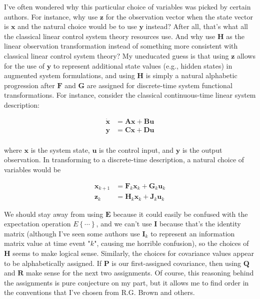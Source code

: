 I’ve often wondered why this particular choice of variables was picked by certain authors.
For instance, why use $\mathbf{z}$ for the observation vector when the state vector is
$\mathbf{x}$ and the natural choice would be to use $\mathbf{y}$ instead? After all,
that’s what all the classical linear control system theory resources use. And why use
$\mathbf{H}$ as the linear observation transformation instead of something more consistent
with classical linear control system theory? My uneducated guess is that using $\mathbf{z}$
allows for the use of $\mathbf{y}$ to represent additional state values (e.g., hidden
states) in augmented system formulations, and using $\mathbf{H}$ is simply a natural
alphabetic progression after $\mathbf{F}$ and $\mathbf{G}$ are assigned for discrete-time
system functional transformations. For instance, consider the classical continuous-time
linear system description:

\begin{equation*}
    \begin{aligned}
        \mathbf{\dot{x}} &= \mathbf{A} \mathbf{x} + \mathbf{B} \mathbf{u} \\
        \mathbf{y} &= \mathbf{C} \mathbf{x} + \mathbf{D} \mathbf{u} \\
    \end{aligned}
\end{equation*}

where $\mathbf{x}$ is the system state, $\mathbf{u}$ is the control input, and $\mathbf{y}$
is the output observation. In transforming to a discrete-time description, a natural
choice of variables would be

\begin{equation*}
    \begin{aligned}
        \mathbf{x}_{k+1} &= \mathbf{F}_k \mathbf{x}_k + \mathbf{G}_k \mathbf{u}_k \\
        \mathbf{z}_k &= \mathbf{H}_k \mathbf{x}_k + \mathbf{J}_k \mathbf{u}_k
    \end{aligned}
\end{equation*}

We should stay away from using $\mathbf{E}$ because it could easily be confused with the
expectation operation $E \left\{ \cdots \right\}$, and we can’t use $\mathbf{I}$ because
that’s the identity matrix (although I’ve seen some authors use $\mathbf{I}_k$ to represent
an information matrix value at time event "$k$", causing me horrible confusion), so the
choices of $\mathbf{H}$ seems to make logical sense. Similarly, the choices for covariance
values appear to be alphabetically assigned. If $\mathbf{P}$ is our first-assigned covariance,
then using $\mathbf{Q}$ and $\mathbf{R}$ make sense for the next two assignments. Of course,
this reasoning behind the assignments is pure conjecture on my part, but it allows me to
find order in the conventions that I’ve chosen from R.G. Brown and others.

